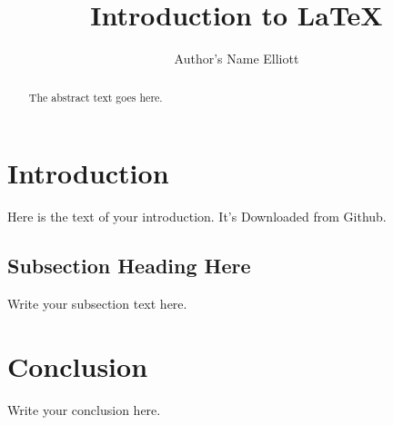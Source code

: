 \documentclass{article}
\begin{document}
\title{Introduction to \LaTeX{}}
\author{Author's Name Elliott}

\maketitle

\begin{abstract}
The abstract text goes here.
\end{abstract}

\section{Introduction}
Here is the text of your introduction.
It's Downloaded from Github.

\subsection{Subsection Heading Here}
Write your subsection text here.

\section{Conclusion}
Write your conclusion here.
\end{document}
